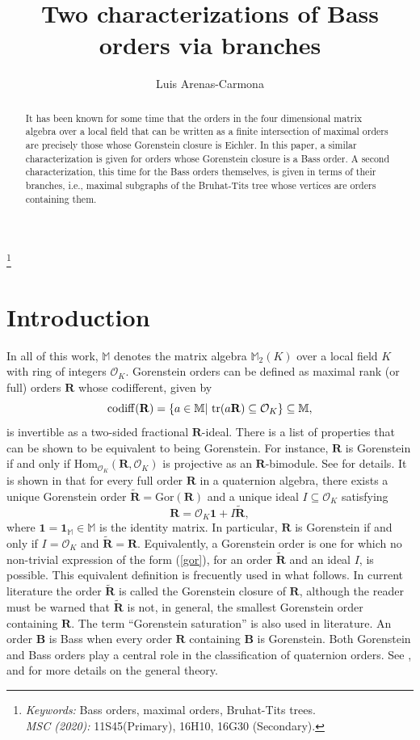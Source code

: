 \documentclass{amsart}
\title[Two characterizations of Bass orders]
{Two characterizations of Bass orders via branches}
\author{Luis Arenas-Carmona}
\theoremstyle{definition}
\newcommand\alge{\mathbb{M}}
\newcommand\tr{\textnormal{ tr}}
\newcommand\oink{\mathcal O}
\newcommand\Ba{\mathbf B}
\newcommand\Ra{\mathbf R}
\begin{document}
\footnote{\emph{Keywords:}
Bass orders, maximal orders, Bruhat-Tits trees.\\
\emph{MSC (2020):} 11S45(Primary), 16H10, 16G30 (Secondary).}

\begin{abstract}
It has been known for some time that the orders in the four
dimensional matrix algebra over a local field
that can be written as a finite
intersection of maximal orders are precisely those whose
Gorenstein closure is Eichler. In this paper, a similar
characterization is given for orders whose Gorenstein closure
is a Bass order. A second characterization, this time for
the Bass orders themselves, is given in terms of their
branches, i.e., maximal subgraphs of the Bruhat-Tits tree
whose vertices are orders containing them.
\end{abstract}

\maketitle

\section{Introduction}\label{intro}

In all of this work, $\alge$ denotes the matrix algebra
$\mathbb{M}_2(K)$ over a local field $K$ with ring of integers
$\mathcal{O}_K$. Gorenstein orders can be defined as maximal rank (or full) orders 
$\Ra$ whose codifferent, given by
$$\mathrm{codiff}(\Ra)=\{a \in\alge| \tr(a\Ra)\subseteq\oink_K\}
\subseteq\alge,$$
is invertible as a two-sided fractional $\Ra$-ideal.
There is a list of properties that can be shown to be equivalent
to being Gorenstein. For instance, $\Ra$ is Gorenstein if
and only if $\mathrm{Hom}_{\oink_K}(\Ra,\oink_K)$ is projective
as an $\Ra$-bimodule. See \cite[Prop. 24.2.3]{voight} for
details. It is shown in \cite[Prop. 24.2.15]{voight} that for 
every full order $\Ra$ in a quaternion algebra, there exists a
unique Gorenstein order $\tilde{\Ra}=\mathrm{Gor}(\Ra)$ 
and a unique ideal $I\subseteq\oink_K$ satisfying 
\begin{equation}\label{gor}
    \Ra=\oink_K\mathbf{1}+I\tilde{\Ra},
\end{equation} 
where $\mathbf{1}=\mathbf{1}_{\alge}\in\alge$ 
is the identity matrix.
In particular, $\Ra$ is Gorenstein if and only if 
$I=\oink_K$ and $\tilde{\Ra}=\Ra$. Equivalently, a 
Gorenstein order is one for which no non-trivial expression 
of the form (\ref{gor}), for an order $\tilde{\Ra}$ and an ideal
$I$, is possible. This equivalent definition 
is frecuently used in what follows.
In current literature the order $\tilde{\Ra}$
is called the Gorenstein closure of $\Ra$,
although the reader must be warned that $\tilde{\Ra}$
is not, in general, the smallest Gorenstein order
containing $\Ra$. The term ``Gorenstein saturation''
is also used in literature.
An order $\Ba$ is Bass when every order $\Ra$ containing
$\Ba$ is Gorenstein. Both Gorenstein and Bass orders play
a central role in the classification of quaternion orders.
See \cite{Brz82}, \cite{Brz83} and \cite[\S24.2]{voight}
for more details on the general theory.
\end{document}
